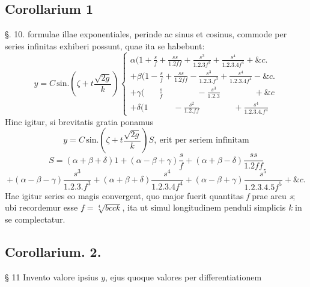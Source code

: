 \documentclass[11pt,a4paper]{article}
\begin{document}
\subsection{Corollarium 1}

§. 10. formulae illae exponentiales, perinde ac sinus et cosinus, commode per
series infinitas exhiberi possunt, quae ita se habebunt:
\[
y = C\,\text{sin.}\left(\zeta + t\frac{\sqrt{2g}}{k}\right)
\left\{
\begin{array}{l}
\alpha(1 + \frac{s}{f} + \frac{ss}{1.2ff} + \frac{s^3}{1.2.3f^3} + \frac{s^4}{1.2.3.4f^4} + \&c. \\[4pt]
+\beta(1 - \frac{s}{f} + \frac{ss}{1.2ff} - \frac{s^3}{1.2.3.f^3} + \frac{s^4}{1.2.3.4f^4} - \&c. \\[4pt]
+\gamma(\phantom{1 +{}} \frac{s}{f} \qquad\qquad - \frac{s^3}{1.2.3} \qquad\qquad + \&c \\[4pt]
+\delta(1 \qquad\quad - \frac{s^2}{1.2.ff} \qquad\qquad + \frac{s^4}{1.2.3.4.f^4}
\end{array}
\right.
\]
Hinc igitur, si brevitatis gratia ponamus
\[
y = C\,\text{sin.}\left(\zeta + t\frac{\sqrt{2g}}{k}\right)S, \ \text{erit per seriem infinitam}
\]
\[
S = (\alpha + \beta + \delta)1 + (\alpha - \beta + \gamma)\frac{s}{f} + (\alpha + \beta - \delta)\frac{ss}{1.2ff}
\]
\[
+ (\alpha - \beta - \gamma)\frac{s^3}{1.2.3.f^3} + (\alpha + \beta + \delta)\frac{s^4}{1.2.3.4f^4} + (\alpha - \beta + \gamma)\frac{s^5}{1.2.3.4.5f^5} + \&c.
\]
Hae igitur series eo magis convergent, quo major fuerit quantitas \emph{f}
prae arcu \emph{s}; ubi recordemur esse $f = \sqrt[4]{bcck}$, ita ut simul
longitudinem penduli simplicis \emph{k} in se complectatur.

\subsection{Corollarium. 2.}

§ 11 Invento valore ipsius $y$, ejus quoque valores per differentiationem
\end{document}
